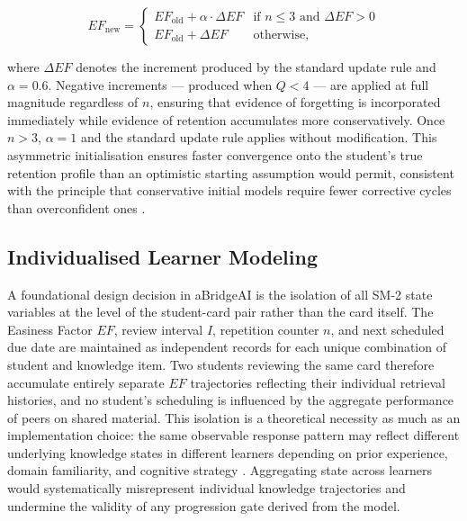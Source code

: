 \begin{equation}
EF_{\text{new}} = 
\begin{cases}
EF_{\text{old}} + \alpha \cdot \Delta EF 
  & \text{if } n \leq 3 \text{ and } \Delta EF > 0 \\
EF_{\text{old}} + \Delta EF 
  & \text{otherwise},
\end{cases}
\end{equation}

where $\Delta EF$ denotes the increment produced by the standard update rule and $\alpha = 0.6$. Negative increments — produced when $Q < 4$ — are applied at full magnitude regardless of $n$, ensuring that evidence of forgetting is incorporated immediately while evidence of retention accumulates more conservatively. Once $n > 3$, $\alpha = 1$ and the standard update rule applies without modification. This asymmetric initialisation ensures faster convergence onto the student's true retention profile than an optimistic starting assumption would permit, consistent with the principle that conservative initial models require fewer corrective cycles than overconfident ones \cite{wozniak1998sm2}.

\subsection{Individualised Learner Modeling}
\label{sec:individualised_modeling}
A foundational design decision in aBridgeAI is the isolation of all SM-2 state variables at the level of the student-card pair rather than the card itself. The Easiness Factor $EF$, review interval $I$, repetition counter $n$, and next scheduled due date are maintained as independent records for each unique combination of student and knowledge item. Two students reviewing the same card therefore accumulate entirely separate $EF$ trajectories reflecting their individual retrieval histories, and no student's scheduling is influenced by the aggregate performance of peers on shared material. This isolation is a theoretical necessity as much as an implementation choice: the same observable response pattern may reflect different underlying knowledge states in different learners depending on prior experience, domain familiarity, and cognitive strategy \cite{corbett1994, vanlehn2006}. Aggregating state across learners would systematically misrepresent individual knowledge trajectories and undermine the validity of any progression gate derived from the model.

